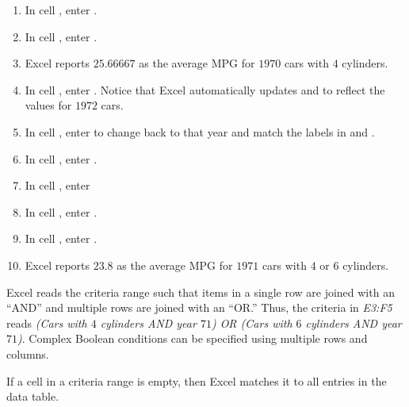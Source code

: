 \begin{enumbox}
\begin{enumerate}
		\item In cell , enter .
		\item In cell , enter .
		\item Excel reports $ 25.66667 $ as the average MPG for $ 1970 $ cars with $ 4 $ cylinders.
		
		\item In cell , enter . Notice that Excel automatically updates  and  to reflect the values for $ 1972 $ cars.
		\item In cell , enter  to change back to that year and match the labels in  and .
	
		\item In cell , enter .
		\item In cell , enter 
		\item In cell , enter .
		\item In cell , enter .
		\item Excel reports $ 23.8 $ as the average MPG for $ 1971 $ cars with $ 4 $ or $ 6 $ cylinders. 
	\end{enumerate}	
\end{enumbox}
	
Excel reads the criteria range such that items in a single row are joined with an ``AND'' and multiple rows are joined with an ``OR.'' Thus, the criteria in \textit{E3:F5} reads \textit{(Cars with $ 4 $ cylinders AND year $ 71 $) OR (Cars with $ 6 $ cylinders AND year $ 71 $)}. Complex Boolean conditions can be specified using multiple rows and columns.

If a cell in a criteria range is empty, then Excel matches it to all entries in the data table.

